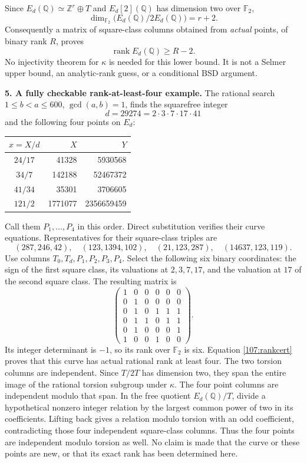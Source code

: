 \documentclass[11pt,a4paper]{article}
\newcommand{\Z}{\mathbb{Z}}
\newcommand{\Q}{\mathbb{Q}}
\numberwithin{equation}{section}
\begin{document}
Since $E_d(\Q)\simeq\Z^r\oplus T$ and $E_d[2](\Q)$ has dimension two over
$\mathbb F_2$,
\[
 \dim_{\mathbb F_2}\bigl(E_d(\Q)/2E_d(\Q)\bigr)=r+2.
\]
Consequently a matrix of square-class columns obtained from \emph{actual}
points, of binary rank $R$, proves
\begin{equation}\label{107:rankcert}
 \operatorname{rank}E_d(\Q)\geq R-2.
\end{equation}
No injectivity theorem for $\kappa$ is needed for this lower bound. It is not
a Selmer upper bound, an analytic-rank guess, or a conditional BSD argument.

\medskip
\textbf{5. A fully checkable rank-at-least-four example.}
The rational search $1\leq b<a\leq600$, $\gcd(a,b)=1$, finds the squarefree
integer
\[
 d=29274=2\cdot3\cdot7\cdot17\cdot41
\]
and the following four points on $E_d$:
\begin{center}
\begin{tabular}{c|r|r}
$x=X/d$ & $X$ & $Y$\\\hline
$24/17$ & 41328 & 5930568\\
$34/7$ & 142188 & 52467372\\
$41/34$ & 35301 & 3706605\\
$121/2$ & 1771077 & 2356659459
\end{tabular}
\end{center}
Call them $P_1,\ldots,P_4$ in this order. Direct substitution verifies their
curve equations. Representatives for their square-class triples are
\[
 (287,246,42),\quad (123,1394,102),\quad
 (21,123,287),\quad (14637,123,119).
\]
Use columns $T_0,T_d,P_1,P_2,P_3,P_4$. Select the following six binary
coordinates: the sign of the first square class, its valuations at
$2,3,7,17$, and the valuation at $17$ of the second square class. The
resulting matrix is
\begin{equation}\label{107:matrix}
 \begin{pmatrix}
 1&0&0&0&0&0\\
 0&1&0&0&0&0\\
 0&1&0&1&1&1\\
 0&1&1&0&1&1\\
 0&1&0&0&0&1\\
 1&0&0&1&0&0
 \end{pmatrix}.
\end{equation}
Its integer determinant is $-1$, so its rank over $\mathbb F_2$ is six.
Equation \eqref{107:rankcert} proves that this curve has actual rational
rank at least four. The two torsion columns are independent. Since $T/2T$ has dimension two,
they span the entire image of the rational torsion subgroup under $\kappa$.
The four point columns are independent modulo that span. In the free
quotient $E_d(\Q)/T$, divide a hypothetical nonzero integer relation by
the largest common power of two in its coefficients. Lifting back gives a
relation modulo torsion with an odd coefficient, contradicting those four
independent square-class columns. Thus the four points are independent
modulo torsion as well. No claim is made that the curve or
these points are new, or that its exact rank has been determined here.
\end{document}
